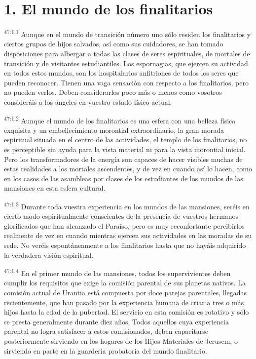\section*{1. El mundo de los finalitarios}
\par
\textsuperscript{47:1.1} Aunque en el mundo de transición número uno sólo residen los finalitarios y ciertos grupos de hijos salvados, así como sus cuidadores, se han tomado disposiciones para albergar a todas las clases de seres espirituales, de mortales de transición y de visitantes estudiantiles. Los espornagias, que ejercen su actividad en todos estos mundos, son los hospitalarios anfitriones de todos los seres que pueden reconocer. Tienen una vaga sensación con respecto a los finalitarios, pero no pueden verlos. Deben considerarlos poco más o menos como vosotros consideráis a los ángeles en vuestro estado físico actual.

\par
\textsuperscript{47:1.2} Aunque el mundo de los finalitarios es una esfera con una belleza física exquisita y un embellecimiento morontial extraordinario, la gran morada espiritual situada en el centro de las actividades, el templo de los finalitarios, no es perceptible sin ayuda para la vista material ni para la vista morontial inicial. Pero los transformadores de la energía son capaces de hacer visibles muchas de estas realidades a los mortales ascendentes, y de vez en cuando así lo hacen, como en los casos de las asambleas por clases de los estudiantes de los mundos de las mansiones en esta esfera cultural.

\par
\textsuperscript{47:1.3} Durante toda vuestra experiencia en los mundos de las mansiones, seréis en cierto modo espiritualmente conscientes de la presencia de vuestros hermanos glorificados que han alcanzado el Paraíso, pero es muy reconfortante percibirlos realmente de vez en cuando mientras ejercen sus actividades en las moradas de su sede. No veréis espontáneamente a los finalitarios hasta que no hayáis adquirido la verdadera visión espiritual.

\par
\textsuperscript{47:1.4} En el primer mundo de las mansiones, todos los supervivientes deben cumplir los requisitos que exige la comisión parental de sus planetas nativos. La comisión actual de Urantia está compuesta por doce parejas parentales, llegadas recientemente, que han pasado por la experiencia humana de criar a tres o más hijos hasta la edad de la pubertad. El servicio en esta comisión es rotativo y sólo se presta generalmente durante diez años. Todos aquellos cuya experiencia parental no logra satisfacer a estos comisionados, deben capacitarse posteriormente sirviendo en los hogares de los Hijos Materiales de Jerusem, o sirviendo en parte en la guardería probatoria del mundo finalitario.

